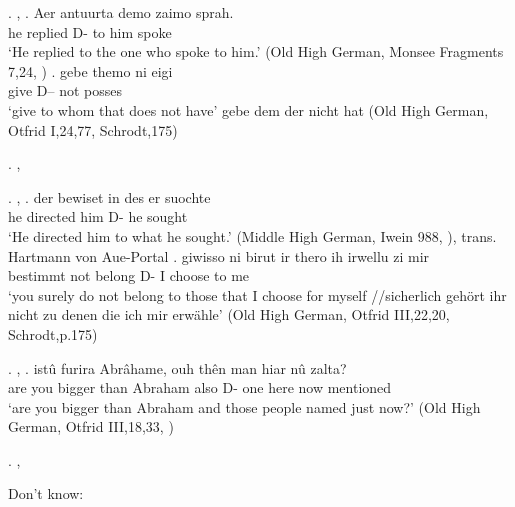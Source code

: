 \ex. , 
\ag. Aer antuurta demo zaimo sprah.\\
he replied D- {to him} spoke\\
`He replied to the one who spoke to him.' \hfill (Old High German, Monsee Fragments 7,24, \citealt[761]{behaghel1923})
\bg. gebe themo ni eigi\\
 give D-- not posses\\
 `give to whom that does not have' gebe dem der nicht hat \hfill (Old High German, Otfrid I,24,77, Schrodt,175)

\ex. , 


\ex. , 
\ag. der bewiset in des er suochte\\
 he directed him D- he sought\\
 `He directed him to what he sought.' \hfill (Middle High German, Iwein 988, \citealt[761]{behaghel1923}), trans. Hartmann von Aue-Portal
\bg. giwisso ni birut ir thero ih irwellu zi mir\\
 bestimmt not belong  D- I choose to me\\
 `you surely do not belong to those that I choose for myself //sicherlich gehört ihr nicht zu denen die ich mir erwähle' \hfill (Old High German, Otfrid III,22,20, Schrodt,p.175)

\ex. , 
\ag. istû furira Abrâhame, ouh thên man hiar nû zalta?\\
 {are you} {bigger than} Abraham also D- one here now mentioned\\
 `are you bigger than Abraham and those people named just now?' \hfill (Old High German, Otfrid III,18,33, \citealt[761]{behaghel1923})

\ex. , 





Don't know:

